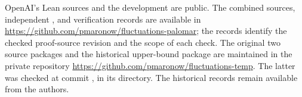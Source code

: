 \statusFormalUpperScope

OpenAI's Lean sources \cite{oai-math-lean} and the development
\cite{hexagon-bias-lean} are public. The combined sources, independent
, and verification records are available in
\url{https://github.com/pmaronow/fluctuations-palomar}; the records
identify the checked proof-source revision and the scope of each check.
The original two source packages and the historical upper-bound package
are maintained in the private repository
\url{https://github.com/pmaronow/fluctuations-temp}. The latter was checked
at commit , in its
 directory. The historical records remain available
from the authors.
